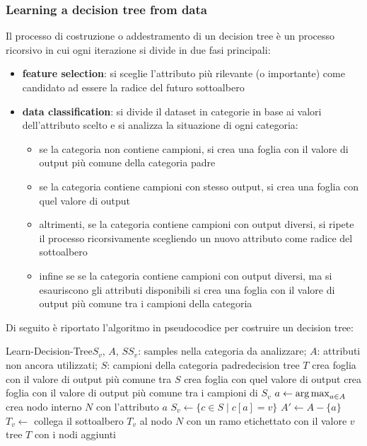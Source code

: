 \subsubsection*{Learning a decision tree from data}
Il processo di costruzione o addestramento di un decision tree è un processo ricorsivo in cui ogni iterazione si divide
in due fasi principali:
\begin{itemize}
	\item \textbf{feature selection}: si sceglie l'attributo più rilevante (o importante) come candidato ad essere la radice
	del futuro sottoalbero
	\item \textbf{data classification}: si divide il dataset in categorie in base ai valori dell'attributo scelto e si
	analizza la situazione di ogni categoria:
	\begin{itemize}[topsep=-3pt]
		\item se la categoria non contiene campioni, si crea una foglia con il valore di output più comune della categoria padre
		\item se la categoria contiene campioni con stesso output, si crea una foglia con quel valore di output
		\item altrimenti, se la categoria contiene campioni con output diversi, si ripete il processo ricorsivamente scegliendo
		un nuovo attributo come radice del sottoalbero
		\item infine se se la categoria contiene campioni con output diversi, ma si esauriscono gli attributi disponibili si
		crea una foglia con il valore di output più comune tra i campioni della categoria
	\end{itemize}
\end{itemize}
Di seguito è riportato l'algoritmo in pseudocodice per costruire un decision tree:

\begin{algo}{Learn-Decision-Tree}{$S_v$, $A$, $S$}{$S_v$: samples nella categoria da analizzare; $A$: attributi non ancora utilizzati; $S$: campioni della categoria padre}{decision tree $T$}
		\State \Return crea foglia con il valore di output più comune tra \(S\)
		\State \Return crea foglia con quel valore di output
		\State \Return crea foglia con il valore di output più comune tra i campioni di \(S_v\)
	\Else
		\State \(a \gets \operatorname*{arg\,max}_{a \in A}\)  
		\State crea nodo interno \(N\) con l'attributo \(a\) 
			\State \(S_v \gets \{c \in S \mid c[a] = v\}\) 
			\State \(A' \gets A - \{a\}\) 
			\State \(T_v \gets\)  
			\State collega il sottoalbero \(T_v\) al nodo \(N\) con un ramo etichettato con il valore \(v\)
		\EndFor
		\Return tree $T$ con i nodi aggiunti
	\EndIf
\end{algo}


